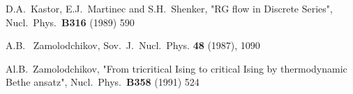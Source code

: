 \documentclass[11pt,a4paper]{article}
\begin{document}
\begin{thebibliography}{99}
 D.A.~Kastor, E.J.~Martinec and S.H.~Shenker, "RG
flow in \coordHE{} Discrete Series", Nucl.~Phys.~\textbf{B316} (1989)
590

 A.B.~ Zamolodchikov, Sov.~J.~Nucl.~Phys. \textbf{48} (1987), 1090



 Al.B.~Zamolodchikov, "From tricritical Ising to
 critical Ising by thermodynamic Bethe ansatz", Nucl.~Phys.~\textbf{B358} (1991) 524








\end{thebibliography}
\end{document}
